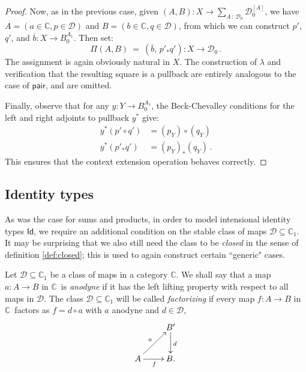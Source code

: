 \documentclass[12pt]{article}
\newcommand{\cors}[1]{\ensuremath{[#1]}}
\newcommand{\C}{\ensuremath{\mathbb{C}}}
\newcommand{\D}{\ensuremath{\mathcal{D}}}
\newcommand{\ty}{\ensuremath{\,:\,}}
\newcommand{\pairmap}{\ensuremath{\mathsf{pair}}}
\newcommand{\Id}{\mathsf{Id}}
\theoremstyle{definition}
\newtheorem{definition}[theorem]{Definition}
\begin{document}
\begin{proof}
Now, as in the previous case, given $(A,B) : X \to \sum_{A\ty\D_0}\D_0^{\cors{A}}$,  we have $A = (a\in\C, p\in\D)$ and $B = (b\in\C, q\in\D)$, from which we can construct $p'$, $q'$, and $\overline{b}: X\to B_0^{A_1}$. Then set:
\[
\Pi(A,B)\ =\ (\overline{b},\, p'_*q') : X \to \D_0\,.
\] 
The assignment is again obviously natural in $X$. 
The construction of  $\lambda$ and  verification that the resulting square is a pullback are entirely analogous to the case of $\pairmap$, and are omitted.

Finally, observe that for any $y : Y\to B_0^{A_1}$, the Beck-Chevalley conditions for the left and right adjoints to pullback $y^*$ give:
\begin{align*}
y^*(p'\circ q') &= (p_Y)\circ(q_Y)\\
y^*(p'_*q') &= (p_Y)_*(q_Y)\,.
\end{align*}
This ensures that the context extension operation behaves correctly.
\end{proof}

\subsection{Identity types}

As was the case for sums and products, in order to model intensional identity types $\Id$, we require an additional condition on the stable class of maps $\D\subseteq\C_1$.  It may be surprising that we also still need the class to be \emph{closed} in the sense of definition \ref{def:closed}; this is used to again construct certain ``generic" cases.  

Let $\D\subseteq\C_1$ be a class of maps in a category \C.
We shall say that a map $a : A \to B$ in \C\ is  \emph{anodyne} if it has the left lifting property with respect to all maps in $\D$.  The class $\D\subseteq\C_1$ will be called \emph{factorizing} if every map $f : A\to B$ in \C\ factors as $f = d\circ a$ with  $a$ anodyne and  $d\in\D$,
\[
\xymatrix{
& B' \ar[d]^{d}\\
A \ar[ru]^{a} \ar[r]_{f} & B.}
\]
%
%
\end{document}
